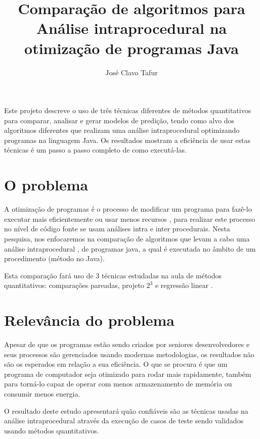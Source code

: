\documentclass[12pt]{article}
\title{Comparação de algoritmos para Análise intraprocedural na otimização de programas Java}
\author{José Clavo Tafur\inst{1} }
\begin{document}
 

\maketitle

\begin{resumo} 
Este projeto descreve o uso de três técnicas diferentes de métodos quantitativos para comparar, analisar e gerar modelos de predição, tendo como alvo dos algoritmos diferentes que realizam uma análise intraprocedural optimizando programas na linguagem Java.
Os resultados mostram a eficiência de usar estas técnicas é um passo a passo completo de como executá-las. 
\end{resumo}

\section{O problema}

A otimização de programas é o processo de modificar um programa para fazê-lo executar mais eficientemente ou  usar menos recursos \cite{program_analysis}, para realizar este processo no nível de código fonte se usam análises intra e inter procedurais. Nesta pesquisa, nos enfocaremos na comparação de algoritmos que levam a cabo uma análise intraprocedural \cite{soot_book}, de programas java, a qual é executada no âmbito de um procedimento (método no Java).

Esta comparação fará uso de 3 técnicas estudadas na aula de métodos quantitativos: comparações pareadas, projeto ${2^3}$ e regressão linear \cite{method_quantitative}.


\section{Relevância do problema}

Apesar de que os programas estão sendo criados por seniores desenvolvedores e seus processos são gerenciados usando modernas metodologias, os resultados não são os esperados em relação a sua eficiência. O que se procura é que um programa de computador seja otimizado para rodar mais rapidamente, também para torná-lo capaz de operar com menos armazenamento de memória ou consumir menos energia.

O resultado deste estudo apresentará quão confiáveis são as técnicas usadas na análise intraprocedural através da execução de casos de teste sendo validados usando métodos quantitativos.
\end{document}
